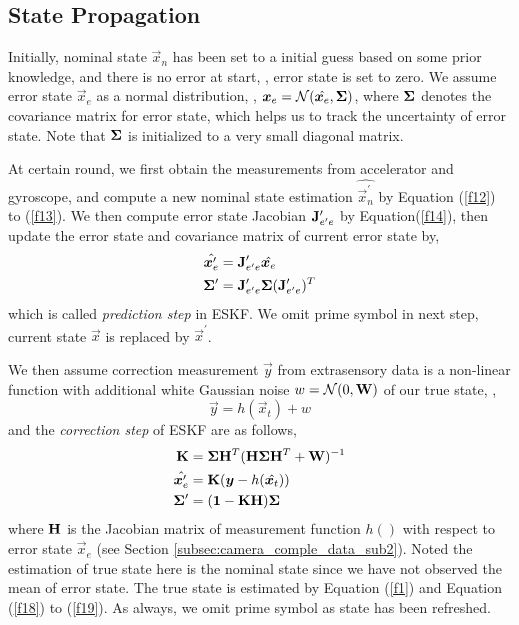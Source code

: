 \subsection{State Propagation}
\label{subsec:ESKF_IMU_sub4}

Initially, nominal state $\vec{x}_n$ has been set to a initial guess based on some prior knowledge, and there is no error at start, \ie, error state is set to zero. We assume error state $\vec{x}_e$ as a normal distribution, \ie, $\boldsymbol{x}_e = \mathcal{N}(\hat{\boldsymbol{x}_e}, \mathbf{\Sigma})$, where $\mathbf{\Sigma}$ denotes the covariance matrix for error state, which helps us to track the uncertainty of error state. Note that $\mathbf{\Sigma}$ is initialized to a very small diagonal matrix.

At certain round, we first obtain the measurements from accelerator and gyroscope, and compute a new nominal state estimation $\hat{\vec{x}_n^\prime}$ by Equation (\ref{f12}) to (\ref{f13}). We then compute error state Jacobian $\mathbf{J}_{e^\prime e}^\prime$ by Equation(\ref{f14}), then update the error state and covariance matrix of current error state by,
\begin{align}
\hat{\boldsymbol{x}_e^\prime} &= \mathbf{J}_{e^\prime e}^\prime\hat{\boldsymbol{x}_e} \\
\mathbf{\Sigma}^\prime &= \mathbf{J}_{e^\prime e}^\prime \mathbf{\Sigma} (\mathbf{J}_{e^\prime e}^\prime)^T
\end{align}
which is called \textit{prediction step} in ESKF. We omit prime symbol in next step, \ie current state $\vec{x}$ is replaced by $\vec{x}^\prime$.

We then assume correction measurement $\vec{y}$ from extrasensory data is a non-linear function with additional white Gaussian noise $w = \mathcal{N}(0, \mathbf{W})$ of our true state, \ie,
\begin{equation}\label{f17}
	\vec{y} = h(\vec{x}_t) + w
\end{equation}
and the \textit{correction step} of ESKF are as follows,
\begin{align}
	\mathbf{K} &= \mathbf{\Sigma}\mathbf{H}^T(\mathbf{H}\mathbf{\Sigma}\mathbf{H}^T+\mathbf{W})^{-1} \\
	\hat{\boldsymbol{x}_e^\prime} &= \mathbf{K} (\boldsymbol{y} - h(\hat{\boldsymbol{x}_t})) \\
	\mathbf{\Sigma}^\prime &= (\mathbf{1} - \mathbf{K}\mathbf{H})\mathbf{\Sigma}
\end{align}
where $\mathbf{H}$ is the Jacobian matrix of measurement function $h()$ with respect to error state $\vec{x}_e$ (see Section \ref{subsec:camera_comple_data_sub2}). Noted the estimation of true state here is the nominal state since we have not observed the mean of error state. The true state is estimated by Equation (\ref{f1}) and Equation (\ref{f18}) to (\ref{f19}). As always, we omit prime symbol as state has been refreshed.

